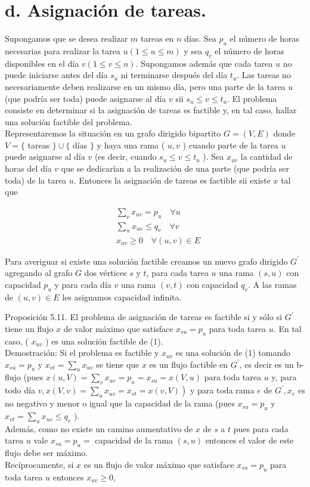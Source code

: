\documentclass[10pt]{article}
\begin{document}
\section*{d. Asignación de tareas.}
Supongamos que se desea realizar $m$ tareas en $n$ días. Sea $p_{u}$ el número de horas necesarias para realizar la tarea $u(1 \leq u \leq m)$ y sea $q_{v}$ el número de horas disponibles en el día $v(1 \leq v \leq n)$. Supongamos además que cada tarea $u$ no puede iniciarse antes del día $s_{u}$ ni terminarse después del día $t_{u}$. Las tareas no necesariamente deben realizarse en un mismo día, pero una parte de la tarea $u$ (que podría ser toda) puede asignarse al día $v$ sii $s_{u} \leq v \leq t_{u}$. El problema consiste en determinar si la asignación de tareas es factible y, en tal caso, hallar una solución factible del problema.\\
Representaremos la situación en un grafo dirigido bipartito $G=(V, E)$ donde $V=\{$ tareas $\} \cup\{$ días $\}$ y haya una rama ( $u, v$ ) cuando parte de la tarea $u$ puede asignarse al día $v$ (es decir, cuando $s_{u} \leq v \leq t_{u}$ ). Sea $x_{u v}$ la cantidad de horas del día $v$ que se dedicarían a la realización de una parte (que podría ser toda) de la tarea $u$. Entonces la asignación de tareas es factible sii existe $x$ tal que


\begin{align*}
& \sum_{v} x_{u v}=p_{u} \quad \forall u \\
& \sum_{u} x_{u v} \leq q_{v} \quad \forall v  \tag{1}\\
& x_{u v} \geq 0 \quad \forall(u, v) \in E
\end{align*}


Para averiguar si existe una solución factible creamos un nuevo grafo dirigido $G^{\prime}$ agregando al grafo $G$ dos vértices $s$ y $t$, para cada tarea $u$ una rama $(s, u)$ con capacidad $p_{u}$ y para cada día $v$ una rama $(v, t)$ con capacidad $q_{v}$. A las ramas de $(u, v) \in E$ les asignamos capacidad infinita.

Proposición 5.11. El problema de asignación de tareas es factible si y sólo si $G^{\prime}$ tiene un flujo $x$ de valor máximo que satisface $x_{s u}=p_{u}$ para toda tarea $u$. En tal caso, ( $x_{u v}$ ) es una solución factible de (1).\\
Demostración: Si el problema es factible y $x_{u v}$ es una solución de (1) tomando $x_{s u}=p_{u}$ y $x_{v t}=\sum_{u} x_{u v}$ se tiene que $x$ es un flujo factible en $G^{\prime}$, es decir es un b-flujo (pues $x(u, V)=\sum_{v} x_{u v}=p_{u}=x_{s u}=x(V, u)$ para toda tarea $u$ y, para todo día $\left.v, x(V, v)=\sum_{u} x_{u v}=x_{v t}=x(v, V)\right)$ y para toda rama $e$ de $G^{\prime}, x_{e}$ es no negativo y menor o igual que la capacidad de la rama (pues $x_{s u}=p_{u}$ y $x_{v t}=\sum_{u} x_{u v} \leq q_{v}$ ).\\
Además, como no existe un camino aumentativo de $x$ de $s$ a $t$ pues para cada tarea $u$ vale $x_{s u}=p_{u}=$ capacidad de la rama $(s, u)$ entonces el valor de este flujo debe ser máximo.\\
Recíprocamente, si $x$ es un flujo de valor máximo que satisface $x_{s u}=p_{u}$ para toda tarea $u$ entonces $x_{u v} \geq 0$,
\end{document}
